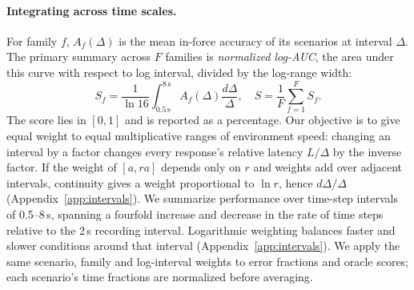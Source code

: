 \documentclass[11pt]{article}
\begin{document}
\paragraph{Integrating across time scales.}
For family $f$, $A_f(\Delta)$ is the mean in-force accuracy of its scenarios at interval $\Delta$.
The primary summary across $F$ families is \emph{normalized log-AUC}, the area under this curve with respect to log interval, divided by the log-range width:
\begin{equation}
 S_f=\frac{1}{\ln 16}\int_{0.5\,\mathrm{s}}^{8\,\mathrm{s}} A_f(\Delta)\frac{d\Delta}{\Delta},\quad
 S=\frac{1}{F}\sum_{f=1}^{F} S_f.
 \label{eq:macro}
\end{equation}
The score lies in $[0,1]$ and is reported as a percentage.
Our objective is to give equal weight to equal multiplicative ranges of environment speed: changing an interval by a factor changes every response's relative latency $L/\Delta$ by the inverse factor.
If the weight of $[a,ra]$ depends only on $r$ and weights add over adjacent intervals, continuity gives a weight proportional to $\ln r$, hence $d\Delta/\Delta$ (Appendix~\ref{app:intervals}).
We summarize performance over time-step intervals of 0.5--8\,s, spanning a fourfold increase and decrease in the rate of time steps relative to the 2\,s recording interval. Logarithmic weighting balances faster and slower conditions around that interval (Appendix~\ref{app:intervals}).
We apply the same scenario, family and log-interval weights to error fractions and oracle scores; each scenario's time fractions are normalized before averaging.
\end{document}
